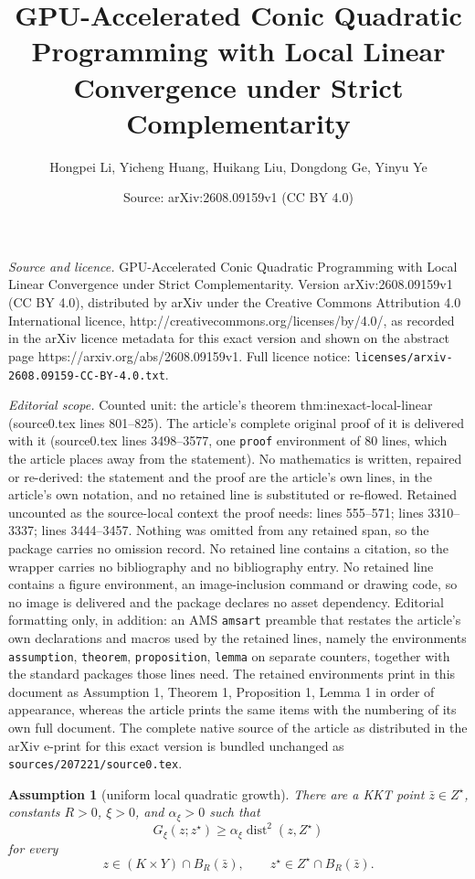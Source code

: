 \documentclass[10pt,a4paper]{amsart}
\title{GPU-Accelerated Conic Quadratic Programming with Local Linear Convergence under Strict Complementarity}
\author{Hongpei Li, Yicheng Huang, Huikang Liu, Dongdong Ge, Yinyu Ye}
\date{Source: arXiv:2608.09159v1 (CC BY 4.0)}
\newtheorem{assumption}{Assumption}
\begin{document}
\maketitle

\noindent\emph{Source and licence.} GPU-Accelerated Conic Quadratic Programming with Local Linear Convergence under Strict Complementarity. Version arXiv:2608.09159v1 (CC BY 4.0), distributed by arXiv under the Creative Commons Attribution 4.0 International licence, http://creativecommons.org/licenses/by/4.0/, as recorded in the arXiv licence metadata for this exact version and shown on the abstract page https://arxiv.org/abs/2608.09159v1. Full licence notice: \texttt{licenses/arxiv-2608.09159-CC-BY-4.0.txt}.\par\smallskip

\noindent\textit{Editorial scope.} Counted unit: the article's theorem thm:inexact-local-linear (source0.tex lines 801--825). The article's complete original proof of it is delivered with it (source0.tex lines 3498--3577, one \texttt{proof} environment of 80 lines, which the article places away from the statement). No mathematics is written, repaired or re-derived: the statement and the proof are the article's own lines, in the article's own notation, and no retained line is substituted or re-flowed.  Retained uncounted as the source-local context the proof needs: lines 555--571; lines 3310--3337; lines 3444--3457.  Nothing was omitted from any retained span, so the package carries no omission record.  No retained line contains a citation, so the wrapper carries no bibliography and no bibliography entry.  No retained line contains a figure environment, an image-inclusion command or drawing code, so no image is delivered and the package declares no asset dependency.  Editorial formatting only, in addition: an AMS \texttt{amsart} preamble that restates the article's own declarations and macros used by the retained lines, namely the environments \texttt{assumption}, \texttt{theorem}, \texttt{proposition}, \texttt{lemma} on separate counters, together with the standard packages those lines need.  The retained environments print in this document as Assumption 1, Theorem 1, Proposition 1, Lemma 1 in order of appearance, whereas the article prints the same items with the numbering of its own full document.  The complete native source of the article as distributed in the arXiv e-print for this exact version is bundled unchanged as \texttt{sources/207221/source0.tex}.
\begin{assumption}[uniform local quadratic growth]
\label{ass:smoothed-qg}
There are a KKT point $\bar z\in Z^\star$, constants $R>0$, $\xi>0$, and
$\alpha_\xi>0$ such that
\begin{equation}
\label{eq:gap-qg}
    G_\xi(z;z^\star)
    \ge
    \alpha_\xi\operatorname{dist}^2(z,Z^\star)
\end{equation}
for every
\[
    z\in(K\times Y)\cap B_R(\bar z),
    \qquad
    z^\star\in Z^\star\cap B_R(\bar z).
\]
\end{assumption}
\end{document}
